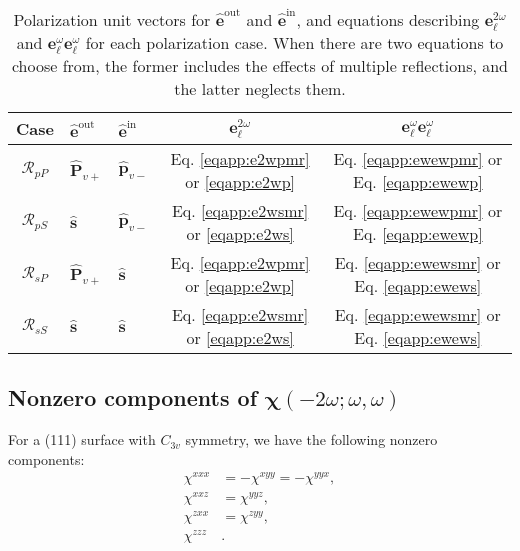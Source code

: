 \begin{table}[b]
\centering
\begin{tabular}{ | c l l | c | c | }
\hline
Case               & $\hat{\mathbf{e}}^{\mathrm{out}}$
                   & $\hat{\mathbf{e}}^{\mathrm{in}}$
                   & $\mathbf{e}^{2\omega}_{\ell}$
                   & $\mathbf{e}^{\omega}_{\ell}\mathbf{e}^{\omega}_{\ell}$ \\
\hline
$\mathcal{R}_{pP}$ & $\hat{\mathbf{P}}_{v+}$
                   & $\hat{\mathbf{p}}_{v-}$
                   &  Eq. \eqref{eqapp:e2wpmr} or \eqref{eqapp:e2wp}
                   & Eq. \eqref{eqapp:ewewpmr} or Eq. \eqref{eqapp:ewewp} \\
$\mathcal{R}_{pS}$ & $\hat{\mathbf{s}}$
                   & $\hat{\mathbf{p}}_{v-}$
                   &  Eq. \eqref{eqapp:e2wsmr} or \eqref{eqapp:e2ws}
                   & Eq. \eqref{eqapp:ewewpmr} or Eq. \eqref{eqapp:ewewp} \\
$\mathcal{R}_{sP}$ & $\hat{\mathbf{P}}_{v+}$
                   & $\hat{\mathbf{s}}$
                   &  Eq. \eqref{eqapp:e2wpmr} or \eqref{eqapp:e2wp}
                   & Eq. \eqref{eqapp:ewewsmr} or Eq. \eqref{eqapp:ewews} \\
$\mathcal{R}_{sS}$ & $\hat{\mathbf{s}}$
                   & $\hat{\mathbf{s}}$
                   &  Eq. \eqref{eqapp:e2wsmr} or \eqref{eqapp:e2ws}
                   & Eq. \eqref{eqapp:ewewsmr} or Eq. \eqref{eqapp:ewews} \\
\hline
\end{tabular}
\caption{Polarization unit vectors for $\hat{\mathbf{e}}^{\mathrm{out}}$ and
$\hat{\mathbf{e}}^{\mathrm{in}}$, and equations describing
$\mathbf{e}^{2\omega}_{\ell}$ and
$\mathbf{e}^{\omega}_{\ell}\mathbf{e}^{\omega}_{\ell}$ for each polarization
case. When there are two equations to choose from, the former includes the
effects of multiple reflections, and the latter neglects
them.\label{tab:review}}
\end{table}


\subsection{Nonzero components of \texorpdfstring{$\boldsymbol{\chi}(-2\omega;
\omega, \omega)$}{X(2w;-w,w)}}

For a (111) surface with $C_{3v}$ symmetry, we have the following nonzero
components: 
\begin{equation}\label{eqapp:nonzero111}
\begin{split}
\chi^{xxx}&=-\chi^{xyy}=-\chi^{yyx},\\
\chi^{xxz}&=\chi^{yyz},\\
\chi^{zxx}&=\chi^{zyy},\\
\chi^{zzz}&.
\end{split}
\end{equation}

